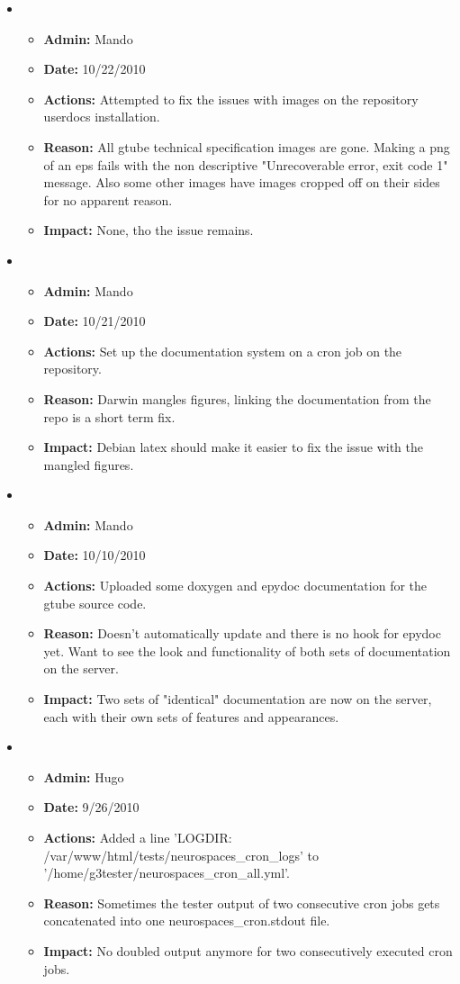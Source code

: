 \documentclass[12pt]{article}
\begin{document}
\begin{itemize}
\item
\begin{itemize}
\item[] {\bf Admin:} Mando
\item[] {\bf Date:} 10/22/2010 
\item[] {\bf Actions:} Attempted to fix the issues with images on the repository userdocs installation. 
\item[] {\bf Reason:} All gtube technical specification images are gone. Making a png of an eps fails with the non descriptive "Unrecoverable error, exit code 1" message. Also some other images have images cropped off on their sides for no apparent reason.
\item[] {\bf Impact:} None, tho the issue remains.
\end{itemize}	

\item
\begin{itemize}
\item[] {\bf Admin:} Mando
\item[] {\bf Date:} 10/21/2010 
\item[] {\bf Actions:} Set up the documentation system on a cron job on the repository. 
\item[] {\bf Reason:} Darwin mangles figures, linking the documentation from the repo is a short term fix.
\item[] {\bf Impact:} Debian latex should make it easier to fix the issue with the mangled figures.
\end{itemize}

\item
\begin{itemize}
\item[] {\bf Admin:} Mando
\item[] {\bf Date:} 10/10/2010 
\item[] {\bf Actions:} Uploaded some doxygen and epydoc documentation for the gtube source code. 
\item[] {\bf Reason:} Doesn't automatically update and there is no hook for epydoc yet. Want to see the look and functionality of both sets of documentation on the server.
\item[] {\bf Impact:} Two sets of "identical" documentation are now on the server, each with their own sets of features and appearances.
\end{itemize}
	
\item
\begin{itemize}
\item[] {\bf Admin:} Hugo
\item[] {\bf Date:} 9/26/2010 
\item[] {\bf Actions:} Added a line 'LOGDIR: /var/www/html/tests/neurospaces\_cron\_logs' to '/home/g3tester/neurospaces\_cron\_all.yml'.
\item[] {\bf Reason:} Sometimes the tester output of two consecutive
  cron jobs gets concatenated into one neurospaces\_cron.stdout file.
\item[] {\bf Impact:} No doubled output anymore for two consecutively executed cron jobs.
\end{itemize}


\end{itemize}
\end{document}
